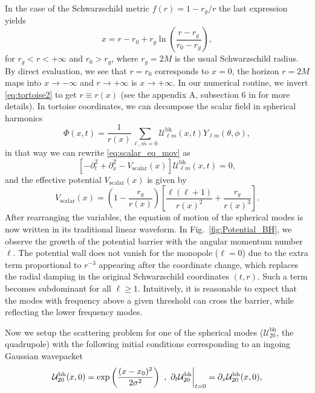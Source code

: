 \documentclass[article,aps,nofootinbib,twocolumn,superscriptaddress]{revtex4-1}
\begin{document}
In the case of the Schwarzschild metric $f(r)=1-r_g/r$ the last expression yields
\begin{equation}
x=r-r_0+r_g\ln\left(\frac{r-r_g}{r_0-r_g}\right),
\label{eq:tortoise2}
\end{equation} 
for $r_g<r<+\infty$ and $r_0>r_g$, where $r_g=2M$ is the usual Schwarzschild radius. By direct evaluation, we see that $r=r_0$ corresponds to $x=0$, the horizon $r=2M$ maps into $x\rightarrow-\infty$ and $r\rightarrow+\infty$ is $x\rightarrow+\infty$. In our numerical routine, we invert \eqref{eq:tortoise2} to get $r\equiv r(x)$ (see the appendix A, subsection 6 in \citep{Frolov:2017asg} for more details). In tortoise coordinates, we can decompose the scalar field in spherical harmonics 
\begin{equation}
\Phi(x,t)=\frac{1}{r(x)}\sum_{\ell,m=0}\mathcal{U}^{\mathrm{bh}}_{\ell m}(x,t)Y_{\ell m}(\theta,\phi),
\label{eq:ylm_decomp}
\end{equation}
in that way we can rewrite \eqref{eq:scalar_eq_mov} as
\begin{equation}
\left[-\partial_t^2+\partial_x^2-V_{\mathrm{scalar}}(x)\right]\mathcal{U}^{\mathrm{bh}}_{\ell m}(x,t) = 0,
\label{eq:wave_scalar}
\end{equation}
and the effective potential $V_{\mathrm{scalar}}(x)$ is given by
\begin{equation}
V_{\mathrm{scalar}}(x) = \left(1-\frac{r_g}{r(x)}\right)\left[\frac{\ell(\ell+1)}{r(x)^2}+\frac{r_g}{r(x)^3}\right].
\end{equation}
After rearranging the variables, the equation of motion of the spherical modes is now written in its traditional linear waveform. In Fig.~\ref{fig:Potential_BH}, we observe the growth of the potential barrier with the angular momentum number $\ell$. The potential wall does not vanish for the monopole ($\ell=0$) due to the extra term proportional to $r^{-3}$ appearing after the coordinate change, which replaces the radial damping in the original Schwarzschild coordinates $(t,r)$. Such a term becomes subdominant for all $\ell\geq 1$. Intuitively, it is reasonable to expect that the modes with frequency above a given threshold can cross the barrier, while reflecting the lower frequency modes. 

Now we setup the scattering problem for one of the spherical modes ($\mathcal{U}^{\mathrm{bh}}_{20}$, the quadrupole) with the following initial conditions corresponding to an ingoing Gaussian wavepacket 
\begin{equation}
\mathcal{U}^{\mathrm{bh}}_{20}(x,0)=\exp\left(\frac{(x-x_0)^2}{2\sigma^2}\right)~,~ \partial_t\mathcal{U}^{\mathrm{bh}}_{20}\bigg{|}_{t=0}=\partial_x \mathcal{U}^{\mathrm{bh}}_{20}(x,0),
\label{eq:scalar_init_cond}
\end{equation}
\end{document}
